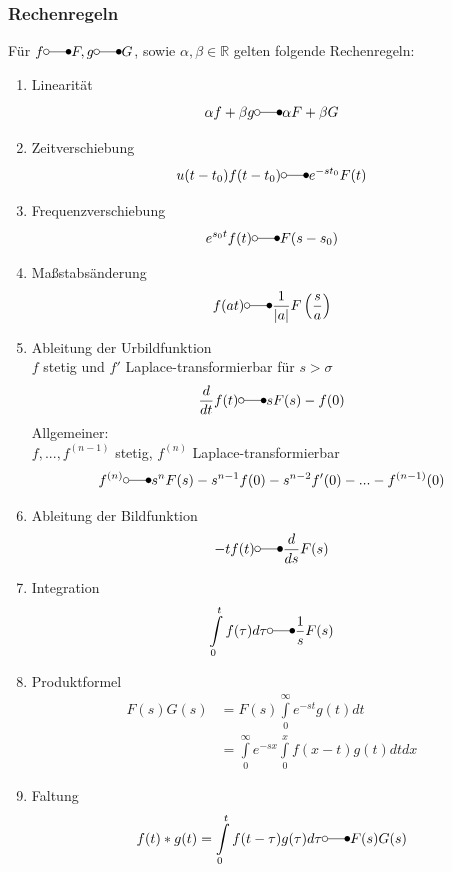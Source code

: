 \documentclass[a4paper,twocolumn,10pt]{article}
\begin{document}
\subsubsection{Rechenregeln}
Für $f\laplace F, g\laplace G$, sowie $\alpha,\beta\in\mathbb{R}$ gelten folgende Rechenregeln:
\begin{enumerate}[label=$\bullet$]
\item Linearität
\begin{equation*}
\alpha f+\beta g\laplace \alpha F+\beta G
\end{equation*}
\item Zeitverschiebung
\begin{equation*}
u(t-t_0)f(t-t_0)\laplace e^{-st_0}F(t)
\end{equation*}
\item Frequenzverschiebung
\begin{equation*}
e^{s_0t}f(t)\laplace F(s-s_0)
\end{equation*}
\item Maßstabsänderung
\begin{equation*}
f(at)\laplace \frac{1}{|a|}F\left(\frac{s}{a}\right)
\end{equation*}
\item Ableitung der Urbildfunktion\\
$f$ stetig und $f'$ Laplace-transformierbar für $s>\sigma$
\begin{equation*}
\frac{d}{dt}f(t)\laplace sF(s)-f(0)
\end{equation*}
Allgemeiner:\\
$f,...,f^{(n-1)}$ stetig, $f^{(n)}$ Laplace-transformierbar
\begin{equation*}
f^{(n)}\laplace s^nF(s)-s^{n-1}f(0)-s^{n-2}f'(0)-...-f^{(n-1)}(0)
\end{equation*}
\item Ableitung der Bildfunktion
\begin{equation*}
-tf(t)\laplace \frac{d}{ds}F(s)
\end{equation*}
\item Integration
\begin{equation*}
\int\limits_{0}^{t}f(\tau)d\tau\laplace \frac{1}{s}F(s)
\end{equation*}
\item Produktformel
\begin{equation*}
\begin{split}
F(s)G(s)&=F(s)\int\limits_{0}^{\infty}e^{-st}g(t)dt\\&=\int\limits_{0}^{\infty}e^{-sx}\int\limits_{0}^{x}f(x-t)g(t)dtdx\end{split}
\end{equation*}
\item Faltung
\begin{equation*}
f(t)*g(t)=\int\limits_{0}^{t}f(t-\tau)g(\tau)d\tau\laplace F(s)G(s)
\end{equation*}
\end{enumerate}
\end{document}
